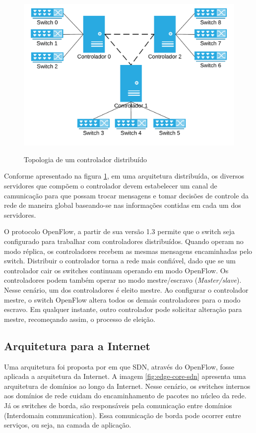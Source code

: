 \begin{figure}[h!]
    \centering
    \includegraphics{img/distributed-controller}
    \label{fig:distributed-controller}
    \caption{Topologia de um controlador distribuído}
\end{figure}

Conforme apresentado na figura \ref{fig:distributed-controller}, em uma
arquitetura distribuída, os diversos servidores que compõem o controlador
devem estabelecer um canal de camunicação para que possam trocar mensagens
e tomar decisões de controle da rede de maneira global baseando-se nas
informações contidas em cada um dos servidores.

O protocolo OpenFlow, a partir de sua versão 1.3 permite que o switch seja 
configurado para trabalhar com controladores distribuídos.
Quando operam no modo réplica, os controladores recebem as mesmas mensagens
encaminhadas pelo switch.
Distribuir o controlador torna a rede mais confiável, dado que se um 
controlador cair os switches continuam operando em modo OpenFlow.
Os controladores podem também operar no modo mestre/escravo 
(\emph{Master/slave}).
Nesse cenário, um dos controladores é eleito mestre. 
Ao configurar o controlador mestre, o switch OpenFlow altera todos os demais
controladores para o modo escravo. 
Em qualquer instante, outro controlador pode solicitar alteração para 
mestre, recomeçando assim, o processo de eleição.


\subsection{Arquitetura para a Internet}

Uma arquitetura foi proposta por \citep{barath2012software} em que SDN, 
através do OpenFlow, fosse aplicada a arquitetura da Internet. 
A imagem \ref{fig:edge-core-sdn} apresenta uma arquitetura de domínios 
ao longo da Internet.
Nesse cenário, os switches internos aos domínios de rede cuidam do 
encaminhamento de pacotes no núcleo da rede.
Já os switches de borda, são responsáveis pela comunicação entre domínios
(Interdomain communication).
Essa comunicação de borda pode ocorrer entre serviços, ou seja,
na camada de aplicação.


